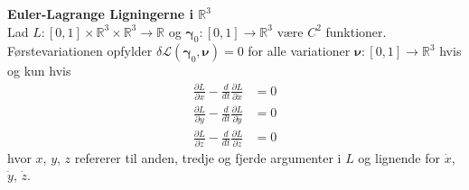 \begin{thm} {\bf Euler-Lagrange Ligningerne i $\mathbb{R}^3$}\\
Lad $ L : [0,1] \times \mathbb{R}^3 \times \mathbb{R}^3 \to \mathbb{R}$ og ${\boldsymbol \gamma}_0 : [0,1] \to \mathbb{R}^3$ være $C^2$ funktioner. Førstevariationen opfylder $\delta \mathscr{L}({\boldsymbol \gamma}_0, {\boldsymbol \nu}) = 0$ for alle variationer ${\boldsymbol \nu} :  [0,1] \to \mathbb{R}^3$ hvis og kun hvis
\begin{align}
\frac{\partial L}{\partial x} -\frac{d}{dt}\frac{\partial L}{\partial \dot{x}} &= 0 \\
\frac{\partial L}{\partial y} -\frac{d}{dt} \frac{\partial L}{\partial \dot{y}} &=0 \\
\frac{\partial L}{\partial z} -\frac{d}{dt} \frac{\partial L}{\partial \dot{z}} &=0
\end{align}
hvor $x$, $y$, $z$ refererer til anden, tredje og fjerde argumenter i $ L$ og lignende for $\dot{x}$, $\dot{y}$, $\dot{z}$.
\end{thm}

